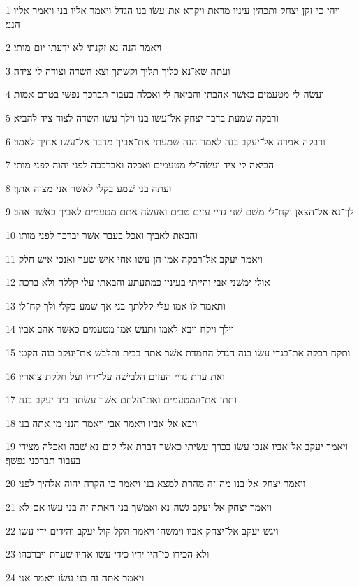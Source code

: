\par 1 ויהי כי־זקן יצחק ותכהין עיניו מראת ויקרא את־עשׂו בנו הגדל ויאמר אליו בני ויאמר אליו הנני׃
\par 2 ויאמר הנה־נא זקנתי לא ידעתי יום מותי׃
\par 3 ועתה שׂא־נא כליך תליך וקשׁתך וצא השׂדה וצודה לי צידה׃
\par 4 ועשׂה־לי מטעמים כאשׁר אהבתי והביאה לי ואכלה בעבור תברכך נפשׁי בטרם אמות׃
\par 5 ורבקה שׁמעת בדבר יצחק אל־עשׂו בנו וילך עשׂו השׂדה לצוד ציד להביא׃
\par 6 ורבקה אמרה אל־יעקב בנה לאמר הנה שׁמעתי את־אביך מדבר אל־עשׂו אחיך לאמר׃
\par 7 הביאה לי ציד ועשׂה־לי מטעמים ואכלה ואברככה לפני יהוה לפני מותי׃
\par 8 ועתה בני שׁמע בקלי לאשׁר אני מצוה אתך׃
\par 9 לך־נא אל־הצאן וקח־לי משׁם שׁני גדיי עזים טבים ואעשׂה אתם מטעמים לאביך כאשׁר אהב׃
\par 10 והבאת לאביך ואכל בעבר אשׁר יברכך לפני מותו׃
\par 11 ויאמר יעקב אל־רבקה אמו הן עשׂו אחי אישׁ שׂער ואנכי אישׁ חלק׃
\par 12 אולי ימשׁני אבי והייתי בעיניו כמתעתע והבאתי עלי קללה ולא ברכה׃
\par 13 ותאמר לו אמו עלי קללתך בני אך שׁמע בקלי ולך קח־לי׃
\par 14 וילך ויקח ויבא לאמו ותעשׂ אמו מטעמים כאשׁר אהב אביו׃
\par 15 ותקח רבקה את־בגדי עשׂו בנה הגדל החמדת אשׁר אתה בבית ותלבשׁ את־יעקב בנה הקטן׃
\par 16 ואת ערת גדיי העזים הלבישׁה על־ידיו ועל חלקת צואריו׃
\par 17 ותתן את־המטעמים ואת־הלחם אשׁר עשׂתה ביד יעקב בנה׃
\par 18 ויבא אל־אביו ויאמר אבי ויאמר הנני מי אתה בני׃
\par 19 ויאמר יעקב אל־אביו אנכי עשׂו בכרך עשׂיתי כאשׁר דברת אלי קום־נא שׁבה ואכלה מצידי בעבור תברכני נפשׁך׃
\par 20 ויאמר יצחק אל־בנו מה־זה מהרת למצא בני ויאמר כי הקרה יהוה אלהיך לפני׃
\par 21 ויאמר יצחק אל־יעקב גשׁה־נא ואמשׁך בני האתה זה בני עשׂו אם־לא׃
\par 22 ויגשׁ יעקב אל־יצחק אביו וימשׁהו ויאמר הקל קול יעקב והידים ידי עשׂו׃
\par 23 ולא הכירו כי־היו ידיו כידי עשׂו אחיו שׂערת ויברכהו׃
\par 24 ויאמר אתה זה בני עשׂו ויאמר אני׃
